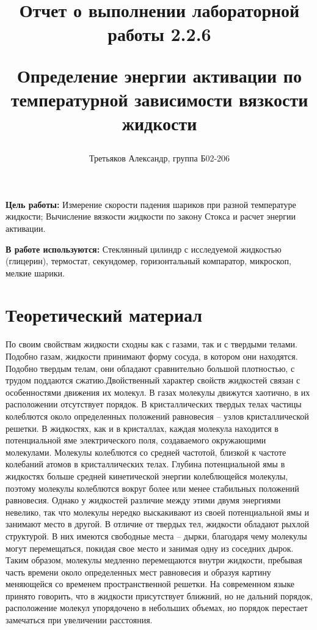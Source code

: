 \documentclass[12pt,a4paper]{article}
\title{
Отчет о выполнении лабораторной работы 2.2.6

Определение энергии активации по температурной зависимости вязкости жидкости
}
\author{Третьяков Александр, группа Б02-206}
\begin{document}
\maketitle
\newpage

\textbf{Цель работы:} Измерение скорости падения шариков при разной температуре жидкости; Вычисление вязкости жидкости по закону Стокса и расчет энергии активации.

\textbf{В работе используются:} Стеклянный цилиндр с исследуемой жидкостью (глицерин), термостат, секундомер, горизонтальный компаратор, микроскоп, мелкие шарики.

\section{Теоретический материал}

По своим свойствам жидкости сходны как с газами, так и с твердыми телами. Подобно газам, жидкости принимают форму сосуда, в котором они находятся. Подобно твердым телам, они обладают сравнительно большой плотностью, с трудом поддаются сжатию.Двойственный характер свойств жидкостей связан с особенностями движения их молекул. В газах молекулы движутся хаотично, в их расположении отсутствует порядок. В кристаллических твердых
телах частицы колеблются около определенных положений равновесия -- узлов кристаллической решетки. В жидкостях, как и в кристаллах, каждая молекула находится в потенциальной яме электрического поля, создаваемого окружающими молекулами. Молекулы колеблются со средней частотой, близкой к частоте колебаний атомов в кристаллических телах. Глубина потенциальной ямы в жидкостях больше средней кинетической энергии колеблющейся молекулы, поэтому молекулы колеблются вокруг более или менее стабильных положений равновесия. Однако у жидкостей различие между этими двумя энергиями невелико, так что молекулы нередко выскакивают из своей потенциальной ямы и занимают место в другой. В отличие от твердых тел, жидкости обладают  рыхлой структурой. В них имеются свободные места  -- дырки, благодаря чему молекулы могут перемещаться, покидая свое место и занимая одну из соседних дырок. Таким образом, молекулы медленно перемещаются внутри жидкости, пребывая часть времени около определенных мест равновесия и образуя картину меняющейся со временем пространственной решетки. На современном языке принято говорить, что в жидкости присутствует ближний, но не дальний порядок, расположение молекул упорядочено в небольших объемах, но порядок перестает замечаться при увеличении расстояния.
\end{document}
